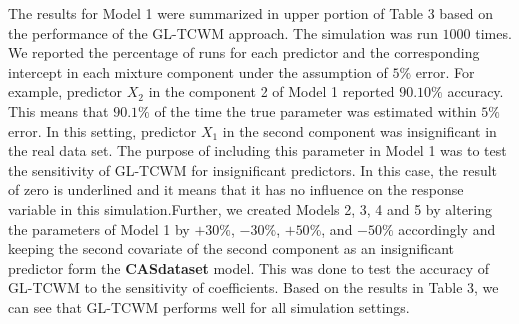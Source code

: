 \documentclass[11pt,letterpaper]{article}
\numberwithin{equation}{section}
\numberwithin{equation}{section}
\numberwithin{equation}{section}
\begin{document}
The results for Model 1 were summarized in upper portion of Table 3 based on the performance of the  GL-TCWM approach. The simulation was run $1000$ times. We reported the percentage of runs for each predictor and the corresponding intercept in each mixture component under the assumption of $5\%$ error. For example, predictor $X_2$ in the component 2 of Model 1 reported $90.10\%$ accuracy. This means that $90.1\%$ of the time the true parameter was estimated within $5\%$ error. In this setting, predictor $X_1$ in the second component was insignificant in the real data set. The purpose of including this parameter in Model 1 was to test the sensitivity of  GL-TCWM for insignificant predictors. In this case, the result of zero is underlined and it means that it has no influence on the response variable in this simulation.Further, we created Models 2, 3, 4 and 5 by altering the parameters of Model 1 by $+30\%$, $-30\%$, $+50\%$, and $-50\%$ accordingly and keeping the second covariate of the second component as an insignificant predictor form the \textbf{CASdataset} model. This was done to test the accuracy of  GL-TCWM to the  sensitivity of coefficients. Based on the results in Table 3, we can see that  GL-TCWM performs well for all simulation settings.
\end{document}
